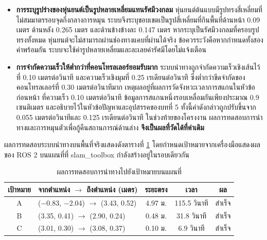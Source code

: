 \documentclass[a4paper,12pt]{report}
\begin{document}
\begin{itemize}[leftmargin=1.25cm, itemsep=6pt, topsep=6pt]
    \item \textbf{การระบุรูปร่างของหุ่นยนต์เป็นรูปหลายเหลี่ยมแทนรัศมีวงกลม}
    หุ่นยนต์ต้นแบบมีรูปทรงสี่เหลี่ยมที่ไม่สมมาตรรอบจุดกึ่งกลางการหมุน
    ระบบจึงระบุขอบเขตเป็นรูปสี่เหลี่ยมที่กินพื้นที่ด้านหน้า 0.09 เมตร
    ด้านหลัง 0.265 เมตร และด้านข้างข้างละ 0.147 เมตร
    หากระบุเป็นรัศมีวงกลมที่ครอบรูปทรงทั้งหมด หุ่นยนต์จะไม่สามารถผ่านช่องทางแคบที่ผ่านได้จริง
    ข้อควรระวังคือหากกำหนดทั้งสองค่าพร้อมกัน ระบบจะใช้ค่ารูปหลายเหลี่ยมและละเลยค่ารัศมีโดยไม่แจ้งเตือน

    \item \textbf{การจำกัดความเร็วให้ต่ำกว่าที่คอนโทรลเลอร์ยอมรับมาก}
    ระบบนำทางถูกจำกัดความเร็วเชิงเส้นไว้ที่ 0.10 เมตรต่อวินาที
    และความเร็วเชิงมุมที่ 0.25 เรเดียนต่อวินาที
    ซึ่งต่ำกว่าขีดจำกัดของคอนโทรลเลอร์ที่ 0.30 เมตรต่อวินาทีมาก
    เหตุผลอยู่ที่ผลการวัดจังหวะเวลาการสแกนในหัวข้อก่อนหน้า
    ที่ความเร็ว 0.10 เมตรต่อวินาที ข้อมูลการสแกนหนึ่งรอบเหลื่อมกันเพียงประมาณ 0.9 เซนติเมตร
    และอธิบายไว้ในหัวข้อปัญหาและอุปสรรคของบทที่ 5
    ทั้งนี้ค่าดังกล่าวถูกปรับขึ้นจาก 0.055 เมตรต่อวินาทีและ 0.125 เรเดียนต่อวินาที
    ในช่วงท้ายของโครงงาน ผลการทดสอบการนำทางและการหมุนตัวเพื่อกู้คืนสถานการณ์ด้านล่าง
    \textbf{จึงเป็นผลที่วัดได้ที่ค่าเดิม}
\end{itemize}

ผลการทดสอบระบบนำทางบนพื้นที่จริงแสดงดังตารางที่ \ref{tab:navresult}
โดยกำหนดเป้าหมายจากเครื่องมือแสดงผลของ ROS 2 บนแผนที่ที่ slam\_toolbox
กำลังสร้างอยู่ในรอบเดียวกัน

\begin{table}[htbp]
\centering
\caption[ผลการทดสอบการนำทางไปยังเป้าหมายบนแผนที่ (บทที่ 4)]{ผลการทดสอบการนำทางไปยังเป้าหมายบนแผนที่}
\label{tab:navresult}
\small
\begin{tabularx}{\textwidth}{|c|X|c|c|c|}
\hline
\textbf{เป้าหมาย} & \textbf{จากตำแหน่ง $\rightarrow$ ถึงตำแหน่ง (เมตร)}
 & \textbf{ระยะตรง} & \textbf{เวลา} & \textbf{ผล} \\
\hline
A & ($-$0.83, $-$2.04) $\rightarrow$ (3.43, 0.52) & 4.97 ม. & 115.5 วินาที & สำเร็จ \\
\hline
B & (3.35, 0.41) $\rightarrow$ (2.90, 0.24) & 0.48 ม. & 31.8 วินาที & สำเร็จ \\
\hline
C & (3.01, 0.30) $\rightarrow$ (3.08, 0.37) & 0.10 ม. & 6.9 วินาที & สำเร็จ \\
\hline
\end{tabularx}
\end{table}
\end{document}
